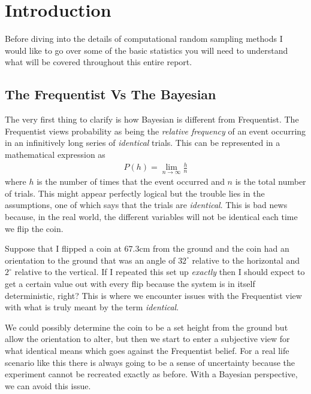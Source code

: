 \documentclass[12pt,twoside]{report}   %
\newcommand{\ti}{\textit}
\begin{document}
\tableofcontents

\pagestyle{fancy}
\renewcommand{\chaptermark}[1]{ \markboth{#1}{} }
\renewcommand{\sectionmark}[1]{ \markright{#1}{} }
\fancyfoot{}
\fancyhead[RO,LE]{\thepage}
\fancyhead[LO]{\leftmark}
\chapter{Introduction}\label{Intro}

Before diving into the details of computational random sampling methods I would like to go over some of the basic statistics you will need to understand what will be covered throughout this entire report. 

\section{The Frequentist Vs The Bayesian}\label{The F Vs B}
\vspace{-0.4in}
\underline{\hspace{6.2in}}
\vspace{-0.1in}

The very first thing to clarify is how Bayesian is different from Frequentist. The Frequentist views probability as being the \textit{relative frequency} of an event occurring in an infinitively long series of \textit{identical} trials. This can be represented in a mathematical expression as
\begin{align*}
P(h) = \lim_{n\to\infty} \frac{h}{n}
\end{align*}
where $h$ is the number of times that the event occurred and $n$ is the total number of trials. This might appear perfectly logical but the trouble lies in the assumptions, one of which says that the trials are \ti{identical}. This is bad news because, in the real world, the different variables will not be identical each time we flip the coin.

Suppose that I flipped a coin at $67.3$cm from the ground and the coin had an orientation to the ground that was an angle of $32^{\circ}$ relative to the horizontal and $2^{\circ}$ relative to the vertical. If I repeated this set up \textit{exactly} then I should expect to get a certain value out with every flip because the system is in itself deterministic, right? This is where we encounter issues with the Frequentist view with what is truly meant by the term \ti{identical}.

We could possibly determine the coin to be a set height from the ground but allow the orientation to alter, but then we start to enter a subjective view for what identical means which goes against the Frequentist belief. For a real life scenario like this there is always going to be a sense of uncertainty because the experiment cannot be recreated exactly as before. With a Bayesian perspective, we can avoid this issue.
\end{document}
